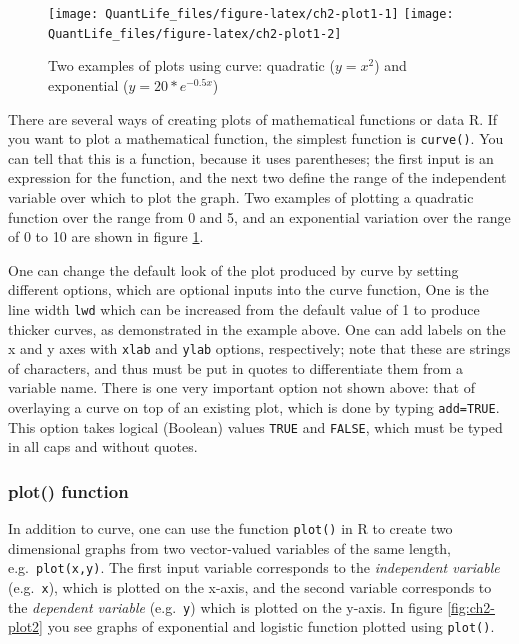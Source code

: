 \documentclass[
]{book}
\begin{document}
\begin{figure}

{\centering \texttt{[image: QuantLife\_files/figure-latex/ch2-plot1-1]} \texttt{[image: QuantLife\_files/figure-latex/ch2-plot1-2]} 

}

\caption{Two examples of plots using curve: quadratic ($y=x^2$) and exponential ($y=20*e^{-0.5x}$)}\label{fig:ch2-plot1}
\end{figure}

There are several ways of   creating plots of mathematical functions or data R. If you want to plot a mathematical function, the simplest function is \texttt{curve()}. You can tell that this is a function, because it uses parentheses; the first input is an expression for the function, and the next two define the range of the independent variable over which to plot the graph. Two examples of plotting a quadratic function over the range from 0 and 5, and an exponential variation over the range of 0 to 10 are shown in figure \ref{fig:ch2-plot1}.

One can change the default look of the plot produced by curve by setting different options, which are optional inputs into the curve function, One is the line width \texttt{lwd} which can be increased from the default value of 1 to produce thicker curves, as demonstrated in the example above. One can add labels on the x and y axes with \texttt{xlab} and \texttt{ylab} options, respectively; note that these are strings of characters, and thus must be put in quotes to differentiate them from a variable name. There is one very important option not shown above: that of overlaying a curve on top of an existing plot, which is done by typing \texttt{add=TRUE}. This option takes logical (Boolean) values \texttt{TRUE} and \texttt{FALSE}, which must be typed in all caps and without quotes.

\hypertarget{plot-function}{%
\subsubsection{plot() function}\label{plot-function}}

In addition to curve, one can use the function \texttt{plot()} in R to create two dimensional graphs from two vector-valued variables of the same length, e.g.~\texttt{plot(x,y)}. The first input variable corresponds to the  \emph{independent variable} (e.g.~\texttt{x}), which is plotted on the x-axis, and the second variable corresponds to the  \emph{dependent variable} (e.g.~\texttt{y}) which is plotted on the y-axis. In figure \ref{fig:ch2-plot2} you see graphs of exponential and logistic function plotted using \texttt{plot()}.
\end{document}
